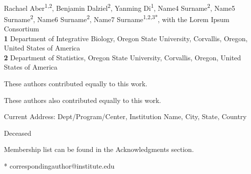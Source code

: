 \documentclass[10pt,letterpaper]{article}
\begin{document}
\vspace*{0.2in}

\begin{flushleft}
{\Large
\textbf{} %
}
\newline
\\
Rachael Aber\textsuperscript{1,2\Yinyang},
Benjamin Dalziel\textsuperscript{2\Yinyang},
Yanming Di\textsuperscript{1\textcurrency},
Name4 Surname\textsuperscript{2},
Name5 Surname\textsuperscript{2\ddag},
Name6 Surname\textsuperscript{2\ddag},
Name7 Surname\textsuperscript{1,2,3*},
with the Lorem Ipsum Consortium\textsuperscript{\textpilcrow}
\\
\bigskip
\textbf{1} Department of Integrative Biology, Oregon State University, Corvallis, Oregon, United States of America
\\
\textbf{2} Department of Statistics, Oregon State University, Corvallis, Oregon, United States of America
\\
\bigskip

% 
%
\Yinyang These authors contributed equally to this work.

\ddag These authors also contributed equally to this work.

\textcurrency Current Address: Dept/Program/Center, Institution Name, City, State, Country %

\dag Deceased

\textpilcrow Membership list can be found in the Acknowledgments section.

* correspondingauthor@institute.edu

\end{flushleft}
\end{document}
